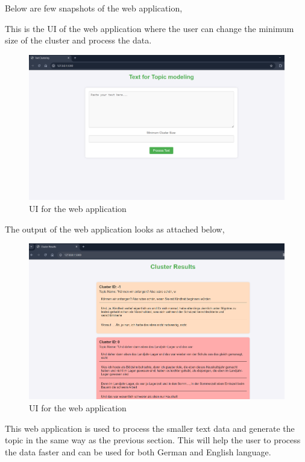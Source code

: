 \noindent Below are few snapshots of the web application, 

This is the UI of the web application where the user can change the minimum size of the cluster and process the data.
\begin{figure}[htbp]
    \begin{center}
      \includegraphics[width=12cm]{./Images/UI 1.png}
       \caption{UI for the web application}
       \label{fig: Web application UI}
    \end{center}
\end{figure}

The output of the web application looks as attached below,

\begin{figure}[htbp]
    \begin{center}
      \includegraphics[width=12cm]{./Images/UI Result.png}
       \caption{UI for the web application}
       \label{fig: Web application Output UI}
    \end{center}
\end{figure}


This web application is used to process the smaller text data and generate the topic in the same way as the previous section.
This will help the user to process the data faster and can be used for both German and English language.


